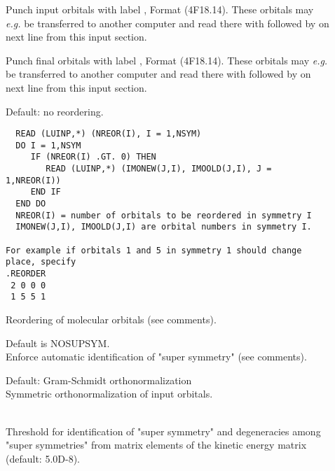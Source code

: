 \begin{description}

\item[]
  Punch input orbitals with label , Format (4F18.14).
  These orbitals may {\it e.g.\/} be transferred to another computer and
  read there with  followed by  on
  next line from this input section.

\item[]
  Punch final orbitals with label , Format (4F18.14).
  These orbitals may {\it e.g.\/} be transferred to another computer and
  read there with  followed by  on
  next line from this input section.

\item[]
Default: no reordering.
\begin{verbatim}
  READ (LUINP,*) (NREOR(I), I = 1,NSYM)
  DO I = 1,NSYM
     IF (NREOR(I) .GT. 0) THEN
        READ (LUINP,*) (IMONEW(J,I), IMOOLD(J,I), J = 1,NREOR(I))
     END IF
  END DO
  NREOR(I) = number of orbitals to be reordered in symmetry I
  IMONEW(J,I), IMOOLD(J,I) are orbital numbers in symmetry I.

For example if orbitals 1 and 5 in symmetry 1 should change place, specify
.REORDER
 2 0 0 0
 1 5 5 1
\end{verbatim}
  Reordering of molecular orbitals (see comments).

\item[]
  Default is NOSUPSYM.\\
  Enforce automatic identification of "super
  symmetry" (see comments).

\item[]
  Default: Gram-Schmidt orthonormalization\\
  Symmetric orthonormalization of input
  orbitals.

\item[]
   \\
  Threshold for identification of "super
  symmetry" and degeneracies among
  "super symmetries" from matrix elements of the kinetic energy matrix
  (default: 5.0D-8).

\end{description}


